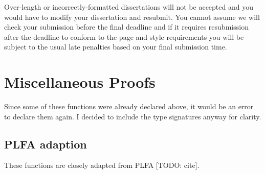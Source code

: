 \documentclass[logo,bsc,singlespacing,parskip,online]{infthesis}
\begin{document}
Over-length or incorrectly-formatted dissertations will not be accepted and you
would have to modify your dissertation and resubmit. You cannot assume we will
check your submission before the final deadline and if it requires resubmission
after the deadline to conform to the page and style requirements you will be
subject to the usual late penalties based on your final submission time.





\appendix

\chapter{Miscellaneous Proofs}

Since some of these functions were already declared above, it would be an error to declare them
again. I decided to include the type signatures anyway for clarity.

\section{PLFA adaption}

These functions are closely adapted from PLFA [TODO: cite].
\end{document}
